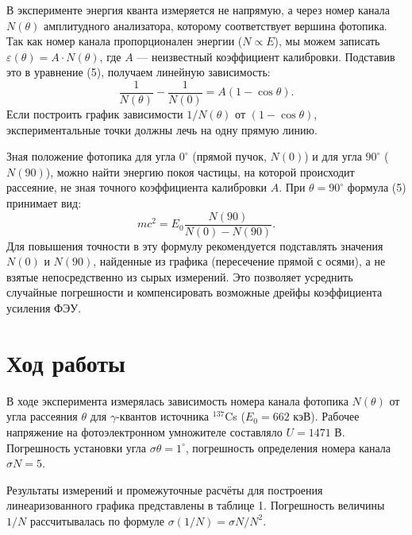 \documentclass[12pt, a4paper]{article}
\begin{document}
В эксперименте энергия кванта измеряется не напрямую, а через номер канала $N(\theta)$ амплитудного анализатора, которому соответствует вершина фотопика. Так как номер канала пропорционален энергии ($N \propto E$), мы можем записать $\varepsilon(\theta) = A \cdot N(\theta)$, где $A$ --- неизвестный коэффициент калибровки. Подставив это в уравнение (5), получаем линейную зависимость:
\begin{equation}
    \frac{1}{N(\theta)} - \frac{1}{N(0)} = A(1 - \cos\theta).
\end{equation}
Если построить график зависимости $1/N(\theta)$ от $(1 - \cos\theta)$, экспериментальные точки должны лечь на одну прямую линию. 

Зная положение фотопика для угла $0^\circ$ (прямой пучок, $N(0)$) и для угла $90^\circ$ ($N(90)$), можно найти энергию покоя частицы, на которой происходит рассеяние, не зная точного коэффициента калибровки $A$. При $\theta = 90^\circ$ формула (5) принимает вид:
\begin{equation}
    mc^2 = E_0 \frac{N(90)}{N(0) - N(90)}.
\end{equation}
Для повышения точности в эту формулу рекомендуется подставлять значения $N(0)$ и $N(90)$, найденные из графика (пересечение прямой с осями), а не взятые непосредственно из сырых измерений. Это позволяет усреднить случайные погрешности и компенсировать возможные дрейфы коэффициента усиления ФЭУ.



\section*{Ход работы}


В ходе эксперимента измерялась зависимость номера канала фотопика $N(\theta)$ от угла рассеяния $\theta$ для $\gamma$-квантов источника $^{137}$Cs ($E_0 = 662$ кэВ). Рабочее напряжение на фотоэлектронном умножителе составляло $U = 1471$ В. Погрешность установки угла $\sigma\theta = 1^\circ$, погрешность определения номера канала $\sigma N = 5$.

Результаты измерений и промежуточные расчёты для построения линеаризованного графика представлены в таблице 1. Погрешность величины $1/N$ рассчитывалась по формуле $\sigma(1/N) = \sigma N / N^2$.
\end{document}
